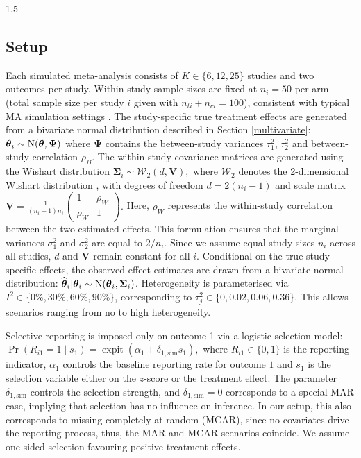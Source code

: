 \documentclass{article}
\begin{document}
\begin{spacing}{1.5}
\subsection{Setup}

Each simulated meta-analysis consists of $K \in \{6,12,25\}$ studies and two outcomes per study. Within-study sample sizes are fixed at $n_i=50$ per arm (total sample size per study $i$ given with $n_{ti} + n_{ci} =100$), consistent with typical MA simulation settings \cite{inthout2014hartung, saracini2025addressing}. The study-specific true treatment effects are generated from a bivariate normal distribution described in Section \ref{multivariate}: $\boldsymbol{\theta}_i \sim \operatorname{N}(\boldsymbol{\theta}, \boldsymbol{\Psi})$ where $\boldsymbol{\Psi}$ contains the between-study variances $\tau^2_1$, $\tau^2_2$ and between-study correlation $\rho_B$. The within-study covariance matrices are generated using the Wishart distribution $\boldsymbol{\Sigma}_i \sim \mathcal{W}_2(d, \boldsymbol{V}),$ where $\mathcal{W}_2$ denotes the 2-dimensional Wishart distribution \cite[p.~366]{held2020likelihood}, with degrees of freedom $d = 2(n_i - 1)$ and scale matrix
$\boldsymbol{V} = \frac{1}{(n_i - 1)n_i}
\begin{pmatrix}
1 & \rho_W \\
\rho_W & 1
\end{pmatrix}.$ Here, $\rho_W$ represents the within-study correlation between the two estimated effects. This formulation ensures that the marginal variances $\sigma_1^2$ and $\sigma_2^2$ are equal to $2/n_i$. Since we assume equal study sizes $n_i$ across all studies, $d$ and $\boldsymbol{V}$ remain constant for all $i$. Conditional on the true study-specific effects, the observed effect estimates are drawn from a bivariate normal distribution: $\widehat{\boldsymbol{\theta}}_i | \boldsymbol{\theta}_i \sim \operatorname{N}(\boldsymbol{\theta}_i, {\boldsymbol{\Sigma}}_i)$. Heterogeneity is parameterised via $I^2 \in \{0\%, 30\%, 60\%, 90\%\}$, corresponding to $\tau_j^2 \in \{0,0.02,0.06,0.36\}$. This allows scenarios ranging from no to high heterogeneity.

Selective reporting is imposed only on outcome 1 via a logistic selection model: $\Pr(R_{i1}=1 \mid s_{1}) = \operatorname{expit}(\alpha_1 + \delta_{1,\text{sim}} s_{1}),$ where $R_{i1}\in\{0,1\}$ is the reporting indicator, $\alpha_1$ controls the baseline reporting rate for outcome $1$ and $s_{1}$ is the selection variable either on the $z$-score or the treatment effect. The parameter $\delta_{1,\text{sim}}$ controls the selection strength, and $\delta_{1,\text{sim}}=0$ corresponds to a special MAR case, implying that selection has no influence on inference. In our setup, this also corresponds to missing completely at random (MCAR), since no covariates drive the reporting process, thus, the MAR and MCAR scenarios coincide. We assume one-sided selection favouring positive treatment effects.


\end{spacing}
\end{document}
